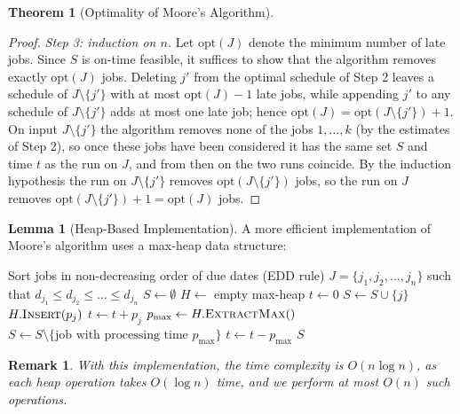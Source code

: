 \documentclass{article}
\newtheorem{remark}{Remark}
\theoremstyle{definition}
\newtheorem{theorem}{Theorem}
\newtheorem{lemma}{Lemma}
\begin{document}
\begin{theorem}[Optimality of Moore's Algorithm]
\begin{proof}
\emph{Step 3: induction on $n$.} Let $\mathrm{opt}(J)$ denote the minimum number of late jobs. Since $S$ is on-time feasible, it suffices to show that the algorithm removes exactly $\mathrm{opt}(J)$ jobs. Deleting $j'$ from the optimal schedule of Step 2 leaves a schedule of $J \setminus \{j'\}$ with at most $\mathrm{opt}(J) - 1$ late jobs, while appending $j'$ to any schedule of $J \setminus \{j'\}$ adds at most one late job; hence $\mathrm{opt}(J) = \mathrm{opt}(J \setminus \{j'\}) + 1$. On input $J \setminus \{j'\}$ the algorithm removes none of the jobs $1, \ldots, k$ (by the estimates of Step 2), so once these jobs have been considered it has the same set $S$ and time $t$ as the run on $J$, and from then on the two runs coincide. By the induction hypothesis the run on $J \setminus \{j'\}$ removes $\mathrm{opt}(J \setminus \{j'\})$ jobs, so the run on $J$ removes $\mathrm{opt}(J \setminus \{j'\}) + 1 = \mathrm{opt}(J)$ jobs.
\end{proof}
\end{theorem}

\begin{lemma}[Heap-Based Implementation]
A more efficient implementation of Moore's algorithm uses a max-heap data structure:

\begin{algorithm}
\caption{Moore's Algorithm with Heap}
\begin{algorithmic}[1]
    \State Sort jobs in non-decreasing order of due dates (EDD rule)
    \State $J = \{j_1, j_2, \ldots, j_n\}$ such that $d_{j_1} \leq d_{j_2} \leq \ldots \leq d_{j_n}$
    \State $S \gets \emptyset$ 
    \State $H \gets$ empty max-heap 
    \State $t \gets 0$ 
        \State $S \gets S \cup \{j\}$ 
        \State $H.\textsc{Insert}(p_j)$ 
        \State $t \gets t + p_j$ 
         
            \State $p_{\max} \gets H.\textsc{ExtractMax}()$ 
            \State $S \gets S \setminus \{\text{job with processing time } p_{\max}\}$
            \State $t \gets t - p_{\max}$ 
        \EndIf
    \EndFor
    \State \Return $S$
\EndProcedure
\end{algorithmic}
\end{algorithm}

\begin{remark}
With this implementation, the time complexity is $O(n \log n)$, as each heap operation takes $O(\log n)$ time, and we perform at most $O(n)$ such operations.
\end{remark}
\end{lemma}
\end{document}
